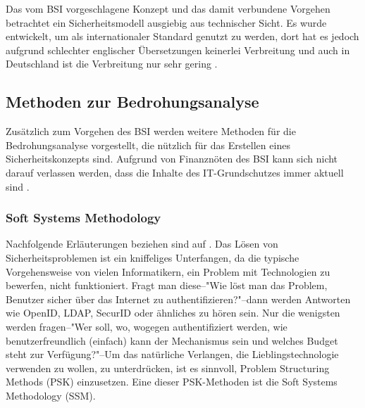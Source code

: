 \documentclass[11pt,a4paper]{report}
\begin{document}
Das vom BSI vorgeschlagene Konzept und das damit verbundene Vorgehen betrachtet ein Sicherheitsmodell ausgiebig aus technischer Sicht. Es wurde entwickelt, um als internationaler Standard genutzt zu werden, dort hat es jedoch aufgrund schlechter englischer Übersetzungen keinerlei Verbreitung und auch in Deutschland ist die Verbreitung nur sehr gering \cite{bsi_kritik}.


\subsection{Methoden zur Bedrohungsanalyse}

Zusätzlich zum Vorgehen des BSI werden weitere Methoden für die Bedrohungsanalyse vorgestellt, die nützlich für das Erstellen eines Sicherheitskonzepts sind. Aufgrund von Finanznöten des BSI kann sich nicht darauf verlassen werden, dass die Inhalte des IT-Grund\-schutzes immer aktuell sind \cite{bsi_not}.

\subsubsection{Soft Systems Methodology} \label{sec:ssm}

Nachfolgende Erläuterungen beziehen sind auf \cite[s.~252]{gutmann}. 
Das Lösen von Sicherheitsproblemen ist ein kniffeliges Unterfangen, da die typische Vorgehensweise von vielen Informatikern, ein Problem mit Technologien zu bewerfen, nicht funktioniert. Fragt man diese--"Wie löst man das Problem, Benutzer sicher über das Internet zu authentifizieren?"--dann werden Antworten wie OpenID, LDAP, SecurID oder ähnliches zu hören sein. Nur die wenigsten werden fragen--"Wer soll, wo, wogegen authentifiziert werden, wie benutzerfreundlich (einfach) kann der Mechanismus sein und welches Budget steht zur Verfügung?"--Um das natürliche Verlangen, die Lieblingstechnologie verwenden zu wollen, zu unterdrücken, ist es sinnvoll, Problem Structuring Methods (PSK) einzusetzen. Eine dieser PSK-Methoden ist die Soft Systems Methodology (SSM).
\end{document}
